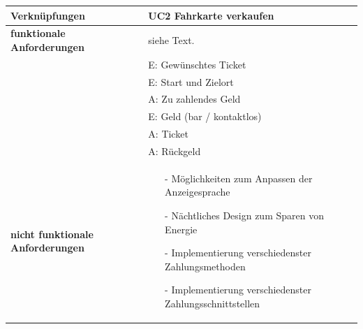 \documentclass{article}
\begin{document}
\begin{tabularx}{\textwidth}{|l|X|}
        \textbf{Verknüpfungen} & UC2 Fahrkarte verkaufen \\\hline
        \textbf{funktionale Anforderungen} & siehe Text. \\ 
        & E: Gewünschtes \gls{Ticket} \\
        & E: Start und Zielort \\
        & A: Zu zahlendes Geld \\
        & E: Geld (bar / kontaktlos) \\
        & A: \gls{Ticket} \\
        & A: Rückgeld \\\hline
        \textbf{nicht funktionale Anforderungen} & \begin{itemize}
            \item[-] Möglichkeiten zum Anpassen der \gls{Anzeigesprache}
            \item[-] Nächtliches Design zum Sparen von Energie
            \item[-] Implementierung verschiedenster \gls{Zahlungsmethoden}
            \item[-] Implementierung verschiedenster \gls{Zahlungsschnittstellen}  
        \end{itemize} \\\hline
    \end{tabularx}
\end{document}
